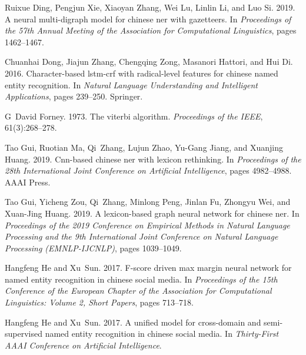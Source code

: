 \documentclass[11pt,a4paper]{article}
\begin{document}
\begin{CJK}{UTF8}{gbsn}
\begin{thebibliography}{35}
Ruixue Ding, Pengjun Xie, Xiaoyan Zhang, Wei Lu, Linlin Li, and Luo Si. 2019.
\newblock A neural multi-digraph model for chinese ner with gazetteers.
\newblock In \emph{Proceedings of the 57th Annual Meeting of the Association
  for Computational Linguistics}, pages 1462--1467.

Chuanhai Dong, Jiajun Zhang, Chengqing Zong, Masanori Hattori, and Hui Di.
  2016.
\newblock Character-based lstm-crf with radical-level features for chinese
  named entity recognition.
\newblock In \emph{Natural Language Understanding and Intelligent
  Applications}, pages 239--250. Springer.

G~David Forney. 1973.
\newblock The viterbi algorithm.
\newblock \emph{Proceedings of the IEEE}, 61(3):268--278.

Tao Gui, Ruotian Ma, Qi~Zhang, Lujun Zhao, Yu-Gang Jiang, and Xuanjing Huang.
  2019{}.
\newblock Cnn-based chinese ner with lexicon rethinking.
\newblock In \emph{Proceedings of the 28th International Joint Conference on
  Artificial Intelligence}, pages 4982--4988. AAAI Press.

Tao Gui, Yicheng Zou, Qi~Zhang, Minlong Peng, Jinlan Fu, Zhongyu Wei, and
  Xuan-Jing Huang. 2019{}.
\newblock A lexicon-based graph neural network for chinese ner.
\newblock In \emph{Proceedings of the 2019 Conference on Empirical Methods in
  Natural Language Processing and the 9th International Joint Conference on
  Natural Language Processing (EMNLP-IJCNLP)}, pages 1039--1049.

Hangfeng He and Xu~Sun. 2017{}.
\newblock F-score driven max margin neural network for named entity recognition
  in chinese social media.
\newblock In \emph{Proceedings of the 15th Conference of the European Chapter
  of the Association for Computational Linguistics: Volume 2, Short Papers},
  pages 713--718.

Hangfeng He and Xu~Sun. 2017{}.
\newblock A unified model for cross-domain and semi-supervised named entity
  recognition in chinese social media.
\newblock In \emph{Thirty-First AAAI Conference on Artificial Intelligence}.


\end{thebibliography}
\end{CJK}
\end{document}
